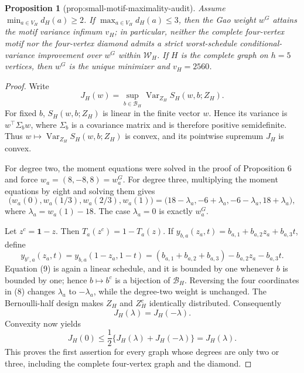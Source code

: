 \documentclass{article}
\newtheorem{proposition}{Proposition}
\begin{document}
\begin{proposition}[prop:small-motif-maximality-audit]\label{prop:small-motif-maximality-audit}
Assume \(\min_{a\in V_H}d_H(a)\ge2\).  If \(\max_{a\in V_H}d_H(a)\le3\), then the Gao weight \(w^G\) attains the motif variance infimum \(v_H\); in particular, neither the complete four-vertex motif nor the four-vertex diamond admits a strict worst-schedule conditional-variance improvement over \(w^G\) within \(\mathcal W_H\).  If \(H\) is the complete graph on \(h=5\) vertices, then \(w^G\) is the unique minimizer and \(v_H=2560\).
\end{proposition}
\begin{proof}
Write
\[
J_H(w)=\sup_{b\in\mathcal B_H}\operatorname{Var}_{Z_H}S_H(w,b;Z_H).
\]
For fixed \(b\), \(S_H(w,b;Z_H)\) is linear in the finite vector \(w\).  Hence its variance is \(w^\top\Sigma_b w\), where \(\Sigma_b\) is a covariance matrix and is therefore positive semidefinite.  Thus \(w\mapsto\operatorname{Var}_{Z_H}S_H(w,b;Z_H)\) is convex, and its pointwise supremum \(J_H\) is convex.

For degree two, the moment equations were solved in the proof of Proposition 6 and force \(w_a=(8,-8,8)=w_a^G\).  For degree three, multiplying the moment equations by eight and solving them gives
\[
\bigl(w_a(0),w_a(1/3),w_a(2/3),w_a(1)\bigr)
=\bigl(18-\lambda_a,-6+\lambda_a,-6-\lambda_a,18+\lambda_a\bigr), \tag{8}
\]
where \(\lambda_a=w_a(1)-18\).  The case \(\lambda_a=0\) is exactly \(w_a^G\).

Let \(z^c=\mathbf1-z\).  Then \(T_a(z^c)=1-T_a(z)\).  If \(y_{b,a}(z_a,t)=b_{a,1}+b_{a,2}z_a+b_{a,3}t\), define
\[
y_{b^c,a}(z_a,t)=y_{b,a}(1-z_a,1-t)
=(b_{a,1}+b_{a,2}+b_{a,3})-b_{a,2}z_a-b_{a,3}t. \tag{9}
\]
Equation (9) is again a linear schedule, and it is bounded by one whenever \(b\) is bounded by one; hence \(b\mapsto b^c\) is a bijection of \(\mathcal B_H\).  Reversing the four coordinates in (8) changes \(\lambda_a\) to \(-\lambda_a\), while the degree-two weight is unchanged.  The Bernoulli-half design makes \(Z_H\) and \(Z_H^c\) identically distributed.  Consequently
\[
J_H(\lambda)=J_H(-\lambda).
\]
Convexity now yields
\[
J_H(0)\le\frac12\{J_H(\lambda)+J_H(-\lambda)\}=J_H(\lambda).
\]
This proves the first assertion for every graph whose degrees are only two or three, including the complete four-vertex graph and the diamond.


\end{proof}
\end{document}
